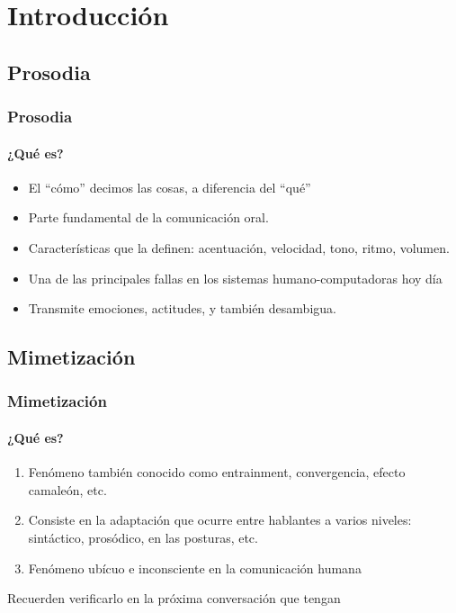 \section{Introducción}

\subsection{Prosodia}

\begin{frame}
  \frametitle{Prosodia}
  \framesubtitle{¿Qué es?}
  \begin{itemize}
    \item El ``cómo'' decimos las cosas, a diferencia del ``qué''
    \item Parte fundamental de la comunicación oral.
    \item Características que la definen: acentuación, velocidad, tono, ritmo, volumen.
    \item Una de las principales fallas en los sistemas humano-computadoras hoy día
    \item Transmite emociones, actitudes, y también desambigua.
  \end{itemize}

  \vfill
\end{frame}


\subsection{Mimetización}

\begin{frame}
  \frametitle{Mimetización}
  \framesubtitle{¿Qué es?}
  \begin{enumerate}
    \item Fenómeno también conocido como entrainment, convergencia, efecto camaleón, etc.
    \item Consiste en la adaptación que ocurre entre hablantes a varios niveles: sintáctico, prosódico, en las posturas, etc.
    \item Fenómeno ubícuo e inconsciente en la comunicación humana
  \end{enumerate}

  Recuerden verificarlo en la próxima conversación que tengan
\end{frame}

